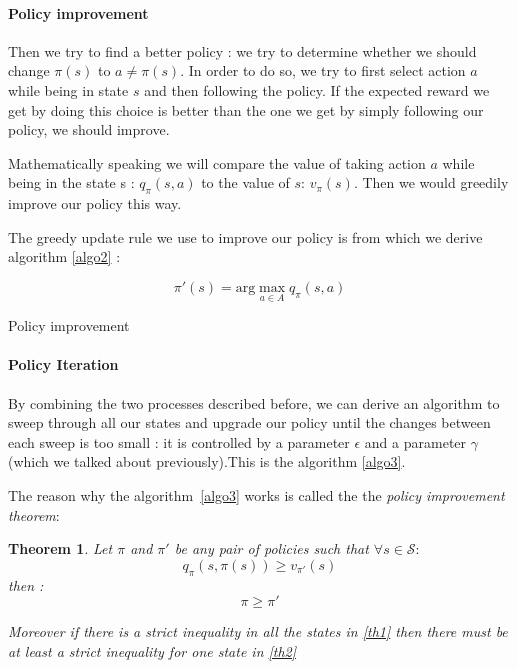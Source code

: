 \documentclass[14pt,a4paper]{article}
\newtheorem{theorem}{Theorem}
\theoremstyle{definition}
\begin{document}
\paragraph{Policy improvement}

Then we try to find a better policy : we try to determine whether we should change $\pi(s) $ to $ a\neq\pi(s)$. In order to do so, we try to first select action $a$ while being in state $s$ and then following the policy. If the expected reward we get by doing this choice is better than the one we get by simply following our policy, we should improve.

Mathematically speaking we will compare the value of taking action $a$ while being in the state s : $q_{\pi}(s,a)$ to the value of $s$: $v_{\pi}(s)$. Then we would greedily improve our policy this way.

The greedy update rule we use to improve our policy is from which we derive algorithm \ref{algo2} : 

$$ 
\pi'(s)=\text{arg}\max_{a \in A}q_{\pi}(s,a)
$$

\begin{algorithm}
\label{algo2}

    
    \caption{Policy improvement}
\end{algorithm}



\paragraph{Policy Iteration} By combining the two processes described before, we can derive an algorithm to sweep through all our states and upgrade our policy until the changes between each sweep is too small : it is controlled by a parameter $\epsilon$ and a parameter $\gamma$ (which we talked about previously).This is the algorithm \ref{algo3}.



The reason why the algorithm~\ref{algo3} works is called the the \emph{policy improvement theorem}:

\begin{theorem}
Let $\pi$ and $\pi'$ be any pair of policies such that  $\forall s \in \mathcal{S} : $
\begin{equation}
q_{\pi}(s,\pi(s))\geq v_{\pi'}(s) \label{th1}
\end{equation}
then :
\begin{equation}
\pi \geq \pi' \label{th2}
\end{equation}


Moreover if there is a strict inequality in all the states in \ref{th1} then there must be at least a strict inequality for one state in \ref{th2}
\end{theorem}
\end{document}
